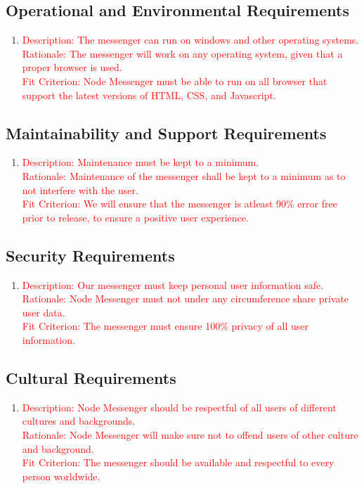 \documentclass[12pt, titlepage]{article}
\begin{document}
    	\subsection{Operational and Environmental Requirements}
    	\begin{enumerate}
    	\item \textcolor{red}{Description: The messenger can run on windows and other operating systems.  \\
    		  Rationale: The messenger will work on any operating system, given that a proper browser is used. \\
    		  Fit Criterion: Node Messenger must be able to run on all browser that support the latest versions of HTML, CSS, and Javascript.}
    	\end{enumerate}
    	\subsection{Maintainability and Support Requirements}
    	\begin{enumerate}
    	\item \textcolor{red}{Description: Maintenance must be kept to a minimum. \\
    		  Rationale: Maintenance of the messenger shall be kept to a minimum as to not interfere with the user. \\
    		  Fit Criterion: We will ensure that the messenger is atleast 90\% error free prior to release, to ensure a positive user experience.}
    	\end{enumerate}
    	\subsection{Security Requirements}
    	\begin{enumerate}
    	\item \textcolor{red}{Description: Our messenger must keep personal user information safe. \\
    		  Rationale: Node Messenger must not under any circumference share private user data. \\
    		  Fit Criterion: The messenger must ensure 100\% privacy of all user information. }
    	\end{enumerate}
    	\subsection{Cultural Requirements}
    	\begin{enumerate}
    	\item \textcolor{red}{Description: Node Messenger should be respectful of all users of different cultures and backgrounds. \\
    		  Rationale: Node Messenger will make sure not to offend users of other culture and background. \\
    		  Fit Criterion: The messenger should be available and respectful to every person worldwide. }
    	\end{enumerate}
\end{document}
